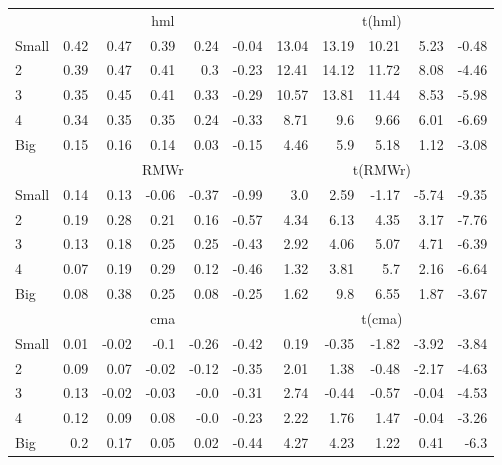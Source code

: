 \begin{table}[!ht]
\begin{tabular}{lrrrrrrrrrr}
  

      & \multicolumn{5}{c}{hml} & \multicolumn{5}{c}{t(hml)} \\
    \cmidrule(r){2-6} \cmidrule(r){7-11}
      Small  & 0.42  & 0.47  & 0.39  & 0.24  & -0.04   & 13.04  & 13.19  & 10.21  & 5.23  & -0.48  \\
          2  & 0.39  & 0.47  & 0.41  & 0.3  & -0.23   & 12.41  & 14.12  & 11.72  & 8.08  & -4.46  \\
          3  & 0.35  & 0.45  & 0.41  & 0.33  & -0.29   & 10.57  & 13.81  & 11.44  & 8.53  & -5.98  \\
          4  & 0.34  & 0.35  & 0.35  & 0.24  & -0.33   & 8.71  & 9.6  & 9.66  & 6.01  & -6.69  \\
      Big    & 0.15  & 0.16  & 0.14  & 0.03  & -0.15   & 4.46  & 5.9  & 5.18  & 1.12  & -3.08  \\

  

      & \multicolumn{5}{c}{RMWr} & \multicolumn{5}{c}{t(RMWr)} \\
    \cmidrule(r){2-6} \cmidrule(r){7-11}
      Small  & 0.14  & 0.13  & -0.06  & -0.37  & -0.99   & 3.0  & 2.59  & -1.17  & -5.74  & -9.35  \\
          2  & 0.19  & 0.28  & 0.21  & 0.16  & -0.57   & 4.34  & 6.13  & 4.35  & 3.17  & -7.76  \\
          3  & 0.13  & 0.18  & 0.25  & 0.25  & -0.43   & 2.92  & 4.06  & 5.07  & 4.71  & -6.39  \\
          4  & 0.07  & 0.19  & 0.29  & 0.12  & -0.46   & 1.32  & 3.81  & 5.7  & 2.16  & -6.64  \\
      Big    & 0.08  & 0.38  & 0.25  & 0.08  & -0.25   & 1.62  & 9.8  & 6.55  & 1.87  & -3.67  \\

  

      & \multicolumn{5}{c}{cma} & \multicolumn{5}{c}{t(cma)} \\
    \cmidrule(r){2-6} \cmidrule(r){7-11}
      Small  & 0.01  & -0.02  & -0.1  & -0.26  & -0.42   & 0.19  & -0.35  & -1.82  & -3.92  & -3.84  \\
          2  & 0.09  & 0.07  & -0.02  & -0.12  & -0.35   & 2.01  & 1.38  & -0.48  & -2.17  & -4.63  \\
          3  & 0.13  & -0.02  & -0.03  & -0.0  & -0.31   & 2.74  & -0.44  & -0.57  & -0.04  & -4.53  \\
          4  & 0.12  & 0.09  & 0.08  & -0.0  & -0.23   & 2.22  & 1.76  & 1.47  & -0.04  & -3.26  \\
      Big    & 0.2  & 0.17  & 0.05  & 0.02  & -0.44   & 4.27  & 4.23  & 1.22  & 0.41  & -6.3  \\

  

  \bottomrule
\end{tabular}
\label{tbl:25_Size_Vol_FF2016a}
\end{table}